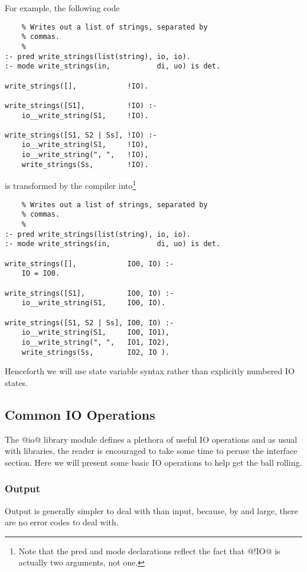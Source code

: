 For example, the following code
\begin{verbatim}
    % Writes out a list of strings, separated by
    % commas.
    %
:- pred write_strings(list(string), io, io).
:- mode write_strings(in,           di, uo) is det.

write_strings([],            !IO).

write_strings([S1],          !IO) :-
    io__write_string(S1,     !IO).

write_strings([S1, S2 | Ss], !IO) :-
    io__write_string(S1,     !IO),
    io__write_string(", ",   !IO),
    write_strings(Ss,        !IO).
\end{verbatim}
is transformed by the compiler into\footnote{Note that the pred and mode declarations reflect
the fact that @!IO@ is actually two arguments, not one.}
\begin{verbatim}
    % Writes out a list of strings, separated by
    % commas.
    %
:- pred write_strings(list(string), io, io).
:- mode write_strings(in,           di, uo) is det.

write_strings([],            IO0, IO) :-
    IO = IO0.

write_strings([S1],          IO0, IO) :-
    io__write_string(S1,     IO0, IO).

write_strings([S1, S2 | Ss], IO0, IO) :-
    io__write_string(S1,     IO0, IO1),
    io__write_string(", ",   IO1, IO2),
    write_strings(Ss,        IO2, IO ).
\end{verbatim}
Henceforth we will use state variable syntax rather than
explicitly numbered IO states.

\subsection{Common IO Operations}

The @io@ library module defines a plethora of useful IO
operations and as usual with libraries, the reader is
encouraged to take some time to peruse the interface section.
Here we will present some basic IO operations to help get the
ball rolling.

\subsubsection{Output}

Output is generally simpler to deal with than input,
because, by and large, there are no error codes to deal
with.

